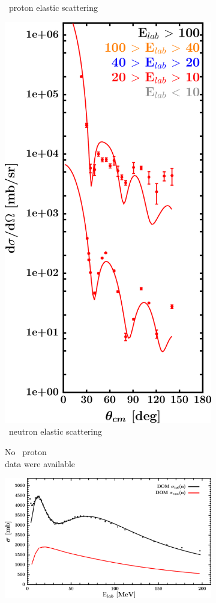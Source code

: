 \begin{figure}[hbtp]
\begin{subfigure}[c]{0.39\textheight}
        \caption{\snTwelve\ proton elastic scattering}
        \label{DOMFitData_sn112_proton_elastic}
    \end{subfigure}\hspace{6pt}
    \begin{subfigure}[c]{0.39\textheight}
        \centering
        \includegraphics[width=0.52\linewidth]{figures/sn112_neutronElastic.png}
        \caption{\snTwelve\ neutron elastic scattering}
        \label{DOMFitData_sn112_neutron_elastic}
    \end{subfigure}\vspace{0.70in}
    \begin{subfigure}[c]{0.45\textwidth}
        \centering
        \caption{No \snTwelve\ proton \rxn\\ data were available}
        \label{DOMFitData_sn112_proton_inelastic}
    \end{subfigure}\hspace{6pt}
    \begin{subfigure}[c]{0.45\textwidth}
        \centering
        \includegraphics[width=\linewidth]{figures/sn112_neutronInelastic.png}

\end{subfigure}
\end{figure}
